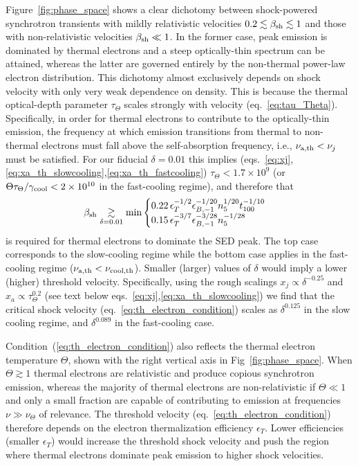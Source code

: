\documentclass[twocolumn]{aastex63}
\begin{document}
Figure~\ref{fig:phase_space} shows a clear dichotomy between shock-powered synchrotron transients with mildly relativistic velocities $0.2 \lesssim \beta_{\rm sh} \lesssim 1$ and those with non-relativistic velocities $\beta_{\rm sh} \ll 1$. In the former case, peak emission is dominated by thermal electrons and a steep optically-thin spectrum can be attained, whereas the latter are governed entirely by the non-thermal power-law electron distribution. This dichotomy  almost exclusively depends on shock velocity with only very weak dependence on density. This is because the thermal optical-depth parameter $\tau_\Theta$ scales strongly with velocity (eq.~\ref{eq:tau_Theta}). 
Specifically, in order for thermal electrons to contribute to the optically-thin emission, the frequency at which emission transitions from thermal to non-thermal electrons must fall above the self-absorption frequency, i.e.,  $\nu_{\rm a,th} < \nu_j$ must be satisfied.   For our fiducial $\delta = 0.01$ this implies (eqs.~\ref{eq:xj},\ref{eq:xa_th_slowcooling},\ref{eq:xa_th_fastcooling}) $\tau_\Theta < 1.7 \times 10^9$ (or $\Theta \tau_\Theta/\gamma_{\rm cool} < 2 \times 10^{10}$ in the fast-cooling regime), and therefore that
\begin{equation}
\label{eq:th_electron_condition}
    \beta_{\rm sh} 
    \underset{\delta=0.01}{\gtrsim}
    \min
    \begin{cases}
    0.22 \, \epsilon_T^{-1/2} \epsilon_{B,-1}^{-1/20} n_5^{1/20} t_{100}^{-1/10} 
    \\
    0.15 \, \epsilon_T^{-3/7} \epsilon_{B,-1}^{-3/28} n_5^{-1/28} 
    \end{cases}
\end{equation}
is required for thermal electrons to dominate the SED peak. 
The top case corresponds to the slow-cooling regime while the bottom case applies in the fast-cooling regime ($\nu_{\rm a,th} < \nu_{\rm cool,th}$).
Smaller (larger) values of $\delta$ would imply a lower (higher) threshold velocity.
Specifically, using the rough scalings $x_j \propto \delta^{-0.25}$ and $x_a \propto \tau_\Theta^{0.2}$ (see text below eqs.~\ref{eq:xj},\ref{eq:xa_th_slowcooling}) we find that the critical shock velocity (eq.~\ref{eq:th_electron_condition}) scales as $\delta^{0.125}$ in the slow cooling regime, and $\delta^{0.089}$ in the fast-cooling case.

Condition~(\ref{eq:th_electron_condition}) also reflects the thermal electron temperature $\Theta$, shown with the right vertical axis in Fig~\ref{fig:phase_space}. When $\Theta \gtrsim 1$ thermal electrons are relativistic and produce copious synchrotron emission, whereas the majority of thermal electrons are non-relativistic if $\Theta \ll 1$ and only a small fraction are capable of contributing to emission at frequencies $\nu \gg \nu_\Theta$ of relevance.
The threshold velocity (eq.~\ref{eq:th_electron_condition}) therefore depends on the electron thermalization efficiency $\epsilon_T$. Lower efficiencies (smaller $\epsilon_T$) would increase the threshold shock velocity and push the region where thermal electrons dominate peak emission 
to higher shock velocities.
\end{document}
